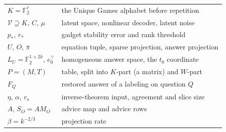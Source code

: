 \documentclass[11pt]{article}
\theoremstyle{definition}
\theoremstyle{remark}
\newcommand{\F}{\mathbb F}
\newcommand{\V}{\mathcal V}
\newcommand{\rs}{r_{\mathrm s}}
\newcommand{\bpi}{\bar\pi}
\begin{document}
\begin{center}\small
\renewcommand{\arraystretch}{1.15}
\begin{tabular}{@{}ll@{}}
\toprule
$K=\F_2^\ell$ & the Unique Games alphabet before repetition \\
$\V\supseteq K$, $C$, $\mu$ & latent space, nonlinear decoder, latent noise \\
$p_*$, $r_*$ & gadget stability error and rank threshold \\
$U$, $O$, $\bpi$ & equation tuple, sparse projection, answer projection \\
$L_U=\F_2^{1+2k}$, $e_0^\top$ & homogeneous answer space, the $t_0$ coordinate \\
$P=(M,T)$ & table, split into $K$-part (a matrix) and $W$-part \\
$F_Q$ & restored answer of a labeling on question $Q$ \\
$\eta$, $\alpha$, $\rs$ & inverse-theorem input, agreement and slice size \\
$A$, $S_O=AM_O$ & advice map and advice rows \\
$\beta=k^{-2/3}$ & projection rate \\
\bottomrule
\end{tabular}
\end{center}
\end{document}
